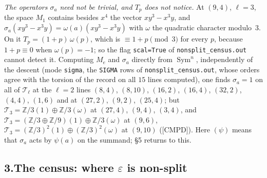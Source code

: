\documentclass[11pt]{article}
\newcommand{\Z}{\mathbb{Z}}
\newcommand{\Sym}{\operatorname{Sym}}
\newcommand{\code}[1]{\texttt{#1}}
\newcommand{\file}[1]{\texttt{#1}}
\newcommand{\CMPD}{\textsf{\small[CMPD]}}
\begin{document}
\emph{The operators $\sigma_a$ need not be trivial, and $T_p$ does not notice.} At $(9,4)$, $\ell=3$, the space $M_1$ contains besides $x^{4}$ the vector $xy^{3}-x^{3}y$, and $\sigma_a(xy^{3}-x^{3}y)=\omega(a)(xy^{3}-x^{3}y)$ with $\omega$ the quadratic character modulo~$3$. On it $T_p=(1+p)\,\omega(p)$, which is $\equiv1+p\pmod3$ for every $p$, because $1+p\equiv0$ when $\omega(p)=-1$; so the flag \code{scal=True} of \file{nonsplit\_census.out} cannot detect it. Computing $M_e$ and $\sigma_a$ directly from $\Sym^{n}$, independently of the descent (mode \code{sigma}, the \code{SIGMA} rows of \file{nonsplit\_census.out}, whose orders agree with the torsion of the record on all $15$ lines computed), one finds $\sigma_a=1$ on all of $\mathcal T_\ell$ at the $\ell=2$ lines $(8,4)$, $(8,10)$, $(16,2)$, $(16,4)$, $(32,2)$, $(4,4)$, $(1,6)$ and at $(27,2)$, $(9,2)$, $(25,4)$; but $\mathcal T_3=\Z/3(1)\oplus\Z/3(\omega)$ at $(27,4)$, $(9,4)$, $(3,4)$, and $\mathcal T_3=(\Z/3\oplus\Z/9)(1)\oplus\Z/3(\omega)$ at $(9,6)$, $\mathcal T_3=(\Z/3)^{2}(1)\oplus(\Z/3)^{2}(\omega)$ at $(9,10)$ (\CMPD). Here $(\psi)$ means that $\sigma_a$ acts by $\psi(a)$ on the summand; \S5 returns to this.

\subsection*{3.\quad The census: where $\varepsilon$ is non-split}
\end{document}
